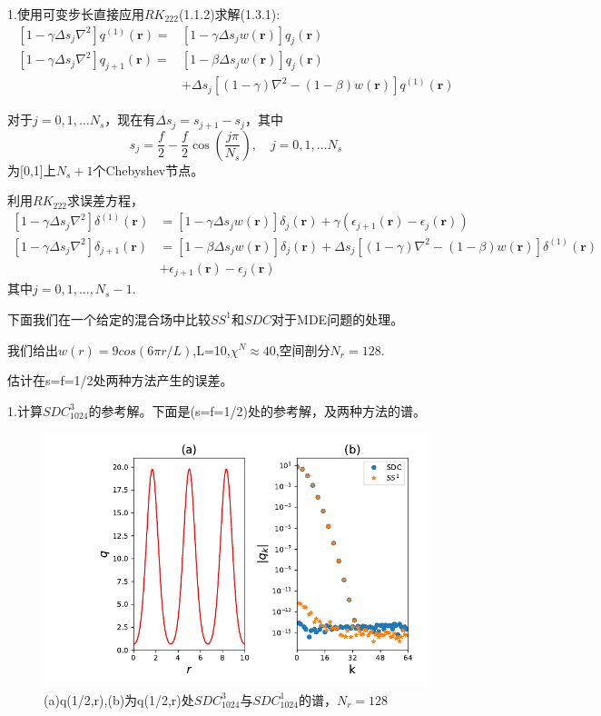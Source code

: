 1.使用可变步长直接应用$RK_{222}$(1.1.2)求解(1.3.1):
\begin{equation}
\begin{aligned}\left[1-\gamma \Delta s_{j} \nabla^{2}\right] q^{(1)}(\mathbf{r})=&\left[1-\gamma \Delta s_{j} w(\mathbf{r})\right] q_{j}(\mathbf{r}) \\\left[1-\gamma \Delta s_{j} \nabla^{2}\right] q_{j+1}(\mathbf{r})=&\left[1-\beta \Delta s_{j} w(\mathbf{r})\right] q_{j}(\mathbf{r}) \\ &+\Delta s_{j}\left[(1-\gamma) \nabla^{2}-(1-\beta) w(\mathbf{r})\right] q^{(1)}(\mathbf{r}) \end{aligned}
\end{equation}

对于$j=0,1, \ldots N_{s}$，现在有$\Delta s_{j}=s_{j+1}-s_{j}$，其中$$
s_{j}=\frac{f}{2}-\frac{f}{2} \cos \left(\frac{j \pi}{N_{s}}\right), \quad j=0,1, \ldots N_{s}
$$为[0,1]上$N_s+1$个Chebyshev节点。

利用$RK_{222}$求误差方程，
$$
\begin{aligned}\left[1-\gamma \Delta s_{j} \nabla^{2}\right] \delta^{(1)}(\mathbf{r}) &=\left[1-\gamma \Delta s_{j} w(\mathbf{r})\right] \delta_{j}(\mathbf{r})+\gamma\left(\epsilon_{j+1}(\mathbf{r})-\epsilon_{j}(\mathbf{r})\right) \\\left[1-\gamma \Delta s_{j} \nabla^{2}\right] \delta_{j+1}(\mathbf{r}) &=\left[1-\beta \Delta s_{j} w(\mathbf{r})\right] \delta_{j}(\mathbf{r})+\Delta s_{j}\left[(1-\gamma) \nabla^{2}-(1-\beta) w(\mathbf{r})\right] \delta^{(1)}(\mathbf{r}) \\ &+\epsilon_{j+1}(\mathbf{r})-\epsilon_{j}(\mathbf{r}) \end{aligned}
$$
其中$j=0,1,...,N_s-1$.


下面我们在一个给定的混合场中比较$SS^1$和$SDC$对于MDE问题的处理。

我们给出$w(r)=9cos(6\pi r/L)$,L=10,$\chi^N \approx40$,空间剖分$N_r=128$.

估计在s=f=1/2处两种方法产生的误差。

1.计算$SDC_{1024}^3$的参考解。下面是(s=f=1/2)处的参考解，及两种方法的谱。
\begin{figure}[ht]
	\centering
	\includegraphics[scale=0.5]{9.png}
	\caption{(a)q(1/2,r),(b)为q(1/2,r)处$SDC_{1024}^3$与$SDC_{1024}^1$的谱，$N_r=128$}
	\label{fig:pathdemo}
\end{figure}

